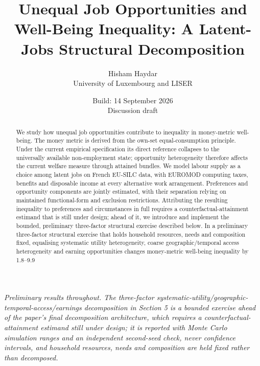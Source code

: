 \documentclass[11pt,a4paper]{article}
\title{Unequal Job Opportunities and Well-Being Inequality: A Latent-Jobs Structural Decomposition}
\author{Hisham Haydar\\University of Luxembourg and LISER}
\date{Build: 14 September 2026\\Discussion draft}
\begin{document}
\maketitle
\begin{abstract}
We study how unequal job opportunities contribute to inequality in money-metric well-being. The money metric is derived from the own-set equal-consumption principle. Under the current empirical specification its direct reference collapses to the universally available non-employment state; opportunity heterogeneity therefore affects the current welfare measure through attained bundles. We model labour supply as a choice among latent jobs on French EU-SILC data, with EUROMOD computing taxes, benefits and disposable income at every alternative work arrangement. Preferences and opportunity components are jointly estimated, with their separation relying on maintained functional-form and exclusion restrictions. Attributing the resulting inequality to preferences and circumstances in full requires a counterfactual-attainment estimand that is still under design; ahead of it, we introduce and implement the bounded, preliminary three-factor structural exercise described below. In a preliminary three-factor structural exercise that holds household resources, needs and composition fixed, equalising systematic utility heterogeneity, coarse geographic/temporal access heterogeneity and earning opportunities changes money-metric well-being inequality by 1.8–9.9%
\end{abstract}

\emph{Preliminary results throughout. The three-factor systematic-utility/geographic-temporal-access/earnings decomposition in Section 5 is a bounded exercise ahead of the paper's final decomposition architecture, which requires a counterfactual-attainment estimand still under design; it is reported with Monte Carlo simulation ranges and an independent second-seed check, never confidence intervals, and household resources, needs and composition are held fixed rather than decomposed.}
\end{document}
